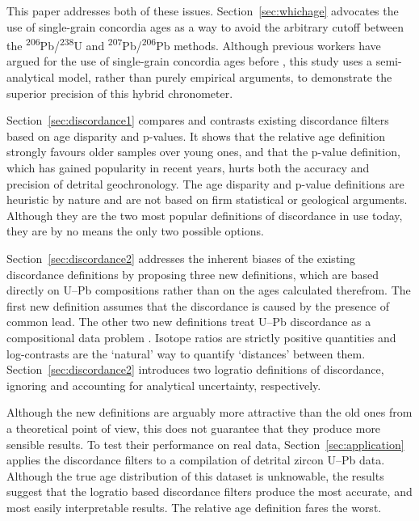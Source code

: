 \documentclass[gchron, manuscript]{copernicus}
\begin{document}
This paper addresses both of these issues. Section~\ref{sec:whichage}
advocates the use of single-grain concordia ages \citep{ludwig1998} as
a way to avoid the arbitrary cutoff between the
\textsuperscript{206}Pb/\textsuperscript{238}U and
\textsuperscript{207}Pb/\textsuperscript{206}Pb methods. Although
previous workers have argued for the use of single-grain concordia
ages before \citep[see][for a recent example]{zimmermann2018}, this
study uses a semi-analytical model, rather than purely empirical
arguments, to demonstrate the superior precision of this hybrid
chronometer.

Section~\ref{sec:discordance1} compares and contrasts existing
discordance filters based on age disparity and p-values. It shows that
the relative age definition strongly favours older samples over young
ones, and that the p-value definition, which has gained popularity in
recent years, hurts both the accuracy and precision of detrital
geochronology. The age disparity and p-value definitions are heuristic
by nature and are not based on firm statistical or geological
arguments.  Although they are the two most popular definitions of
discordance in use today, they are by no means the only two possible
options.

Section~\ref{sec:discordance2} addresses the inherent biases of the
existing discordance definitions by proposing three new definitions,
which are based directly on U--Pb compositions rather than on the ages
calculated therefrom. The first new definition assumes that the
discordance is caused by the presence of common lead. The other two
new definitions treat U--Pb discordance as a compositional data
problem \citep[\textit{sensu}][]{aitchison1986}.  Isotope ratios are
strictly positive quantities and log-contrasts are the `natural' way
to quantify `distances' between them.  Section~\ref{sec:discordance2}
introduces two logratio definitions of discordance, ignoring and
accounting for analytical uncertainty, respectively.

Although the new definitions are arguably more attractive than the old
ones from a theoretical point of view, this does not guarantee that
they produce more sensible results. To test their performance on real
data, Section~\ref{sec:application} applies the discordance filters to
a compilation of detrital zircon U--Pb data. Although the true age
distribution of this dataset is unknowable, the results suggest that
the logratio based discordance filters produce the most accurate, and
most easily interpretable results. The relative age definition fares
the worst.
\end{document}
